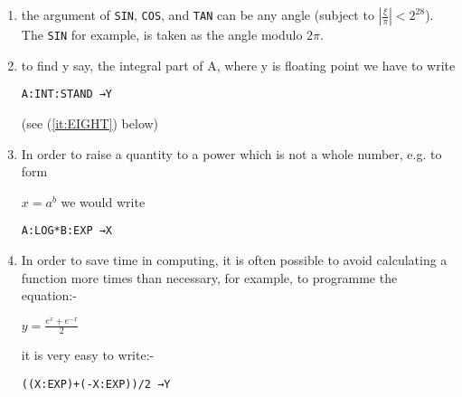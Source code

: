 \documentclass[10pt, a4paper, oneside]{article}
\newcommand{\mytt}[1]{\texttt{\scriptsize #1}}
\newcommand{\mytt}[1]{\texttt{\small #1}}
\begin{document}
\begin{multicols}{2}
\begin{enumerate}
\item the argument of \mytt{SIN}, \mytt{COS}, and \mytt{TAN} can be any angle
(subject to $|\frac{\xi}{\pi}| < 2^{28}$).  The \mytt{SIN} for example, is
taken as the angle modulo $2\pi$.

\item to find y say, the integral part of A, where y
is floating point we have to write

\begin{addmargin}[1cm]{1em}%
\begin{lstlisting}
A:INT:STAND →Y
\end{lstlisting}
\end{addmargin}

\begin{flushright}
(see (\ref{it:EIGHT}) below)
\end{flushright}

\item In order to raise a quantity to a power which is
not a whole number, e.g. to form

\begin{flushright}
$x = a^{b}$ we would write \hspace{5em}
\end{flushright}

\begin{addmargin}[1cm]{1em}%
\begin{lstlisting}
A:LOG*B:EXP →X
\end{lstlisting}
\end{addmargin}

\item In order to save time in computing, it is often
possible to avoid calculating a function more times
than necessary, for example, to programme the equation:-

\begin{addmargin}[1cm]{1em}%
\begin{math}
y = \frac{e^{x}+e^{-x}}{2}
\end{math}
\end{addmargin}

\begin{flushleft}
it is very easy to write:-
\end{flushleft}

\begin{addmargin}[1cm]{1em}%
\begin{lstlisting}
((X:EXP)+(-X:EXP))/2 →Y
\end{lstlisting}
\end{addmargin}


\end{enumerate}
\end{multicols}
\end{document}

